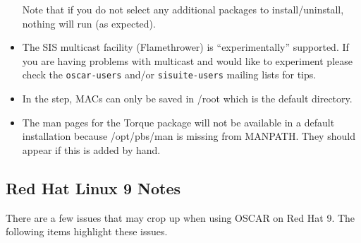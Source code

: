 \begin{itemize}
  Note that if you do not select any additional packages to
  install/uninstall, nothing will run (as expected).

\item The SIS multicast facility (Flamethrower) is ``experimentally''
  supported.  If you are having problems with multicast and would like
  to experiment please check the {\tt oscar-users} and/or
  {\tt sisuite-users} mailing lists for tips.

\begchange
\item In the  step, MACs can
  only be saved in /root which is the default directory.

\item The man pages for the Torque package will not be available in
  a default installation because /opt/pbs/man is missing from
  MANPATH.  They should appear if this is added by hand.
\endchange


\end{itemize}


\subsection{Red Hat Linux 9 Notes}
\label{subsec:rh90notes}

There are a few issues that may crop up when using OSCAR on Red Hat 9.
The following items highlight these issues.

